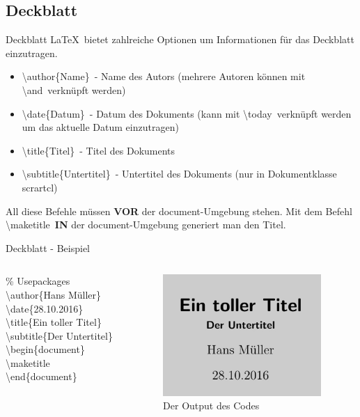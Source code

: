 \subsection{Deckblatt}
\begin{frame}{Deckblatt}
    \LaTeX~bietet zahlreiche Optionen um Informationen f\"ur das Deckblatt einzutragen.
    \begin{itemize}
        \item \cblue\textbackslash author\black\{Name\}~- Name des Autors (mehrere Autoren k\"onnen mit \cblue\textbackslash and\black~verkn\"upft werden)
        \item \cblue\textbackslash date\black\{Datum\}~- Datum des Dokuments (kann mit \cblue\textbackslash today\black~verkn\"upft werden um das aktuelle Datum einzutragen)
        \item \cblue\textbackslash title\black\{Titel\}~- Titel des Dokuments
        \item \cblue\textbackslash subtitle\black\{Untertitel\}~- Untertitel des Dokuments (nur in Dokumentklasse scrartcl)
    \end{itemize}
    All diese Befehle m\"ussen \textbf{VOR} der \cpurple document\black-Umgebung stehen. Mit dem Befehl \cblue\textbackslash maketitle\black~\textbf{IN} der \cpurple document\black-Umgebung generiert man den Titel.
\end{frame}
\begin{frame}{Deckblatt - Beispiel}
    \begin{columns}
    \begin{column}{.4\textwidth}
        \% Usepackages \\
        \cblue\textbackslash author\black\{Hans M\"uller\}\\
        \cblue\textbackslash date\black\{28.10.2016\}\\
        \cblue\textbackslash title\black\{Ein toller Titel\}\\
        \cblue\textbackslash subtitle\black\{Der Untertitel\}\\
        \cblue\textbackslash begin\black\{\cpurple document\black\}\\
        \cblue\textbackslash maketitle\black\\
        \cblue\textbackslash end\black\{\cpurple document\black\} 
    \end{column}
    \begin{column}{.6\textwidth}
    \begin{figure}
        \centering
        \includegraphics[width=6cm]{images/title.jpg}
        \caption{Der Output des Codes}
    \end{figure}
    \end{column}
    \end{columns}
\end{frame}
